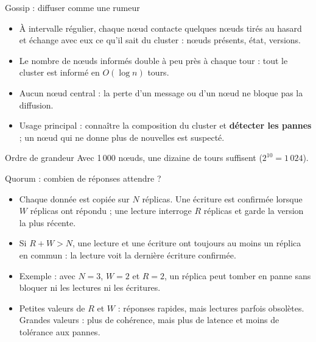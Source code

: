 \begin{frame}{Gossip : diffuser comme une rumeur}
    \begin{itemize}
        \item À intervalle régulier, chaque nœud contacte quelques nœuds tirés
              au hasard et échange avec eux ce qu'il sait du cluster : nœuds
              présents, état, versions.
        \item Le nombre de nœuds informés double à peu près à chaque tour : tout
              le cluster est informé en $O(\log n)$ tours.
        \item Aucun nœud central : la perte d'un message ou d'un nœud ne bloque
              pas la diffusion.
        \item Usage principal : connaître la composition du cluster et
              \textbf{détecter les pannes} ; un nœud qui ne donne plus de
              nouvelles est suspecté.
    \end{itemize}

    \begin{examplebox}{Ordre de grandeur}
        Avec 1\,000 nœuds, une dizaine de tours suffisent ($2^{10} = 1\,024$).
    \end{examplebox}

\end{frame}

\begin{frame}{Quorum : combien de réponses attendre ?}
    \begin{itemize}
        \item Chaque donnée est copiée sur $N$ réplicas. Une écriture est
              confirmée lorsque $W$ réplicas ont répondu ; une lecture interroge
              $R$ réplicas et garde la version la plus récente.
        \item Si \textbf{$R + W > N$}, une lecture et une écriture ont toujours
              au moins un réplica en commun : la lecture voit la dernière
              écriture confirmée.
        \item Exemple : avec $N = 3$, $W = 2$ et $R = 2$, un réplica peut tomber
              en panne sans bloquer ni les lectures ni les écritures.
        \item Petites valeurs de $R$ et $W$ : réponses rapides, mais lectures
              parfois obsolètes. Grandes valeurs : plus de cohérence, mais plus
              de latence et moins de tolérance aux pannes.
    \end{itemize}

\end{frame}

